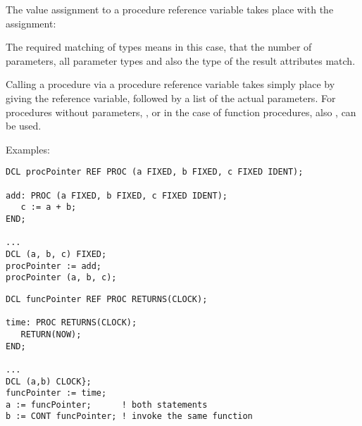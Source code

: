 The value assignment to a procedure reference variable takes place with
the assignment:

\begin{grammarframe}

\end{grammarframe}


The required matching of types means in this case, that the number of
parameters, all parameter types and also the type of the result
attributes match.

Calling a procedure via a procedure reference variable takes simply
place by giving the reference variable, followed by a list of the actual
parameters. For procedures without parameters, , or in the case of
function procedures, also , can be used.

Examples:
\begin{lstlisting}
DCL procPointer REF PROC (a FIXED, b FIXED, c FIXED IDENT);

add: PROC (a FIXED, b FIXED, c FIXED IDENT);
   c := a + b;
END;

...
DCL (a, b, c) FIXED;
procPointer := add;
procPointer (a, b, c);
\end{lstlisting}

\begin{lstlisting}
DCL funcPointer REF PROC RETURNS(CLOCK);

time: PROC RETURNS(CLOCK);
   RETURN(NOW);
END;

...
DCL (a,b) CLOCK};
funcPointer := time;
a := funcPointer;      ! both statements
b := CONT funcPointer; ! invoke the same function
\end{lstlisting}

